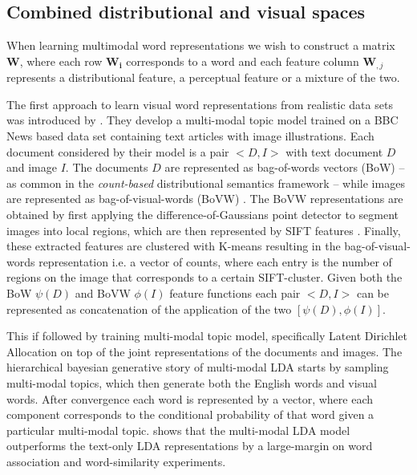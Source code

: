 \subsection{Combined distributional and visual spaces}
\label{sec:distvis}

When learning multimodal word representations we wish to construct a matrix $\mathbf{W}$,
where each row $\mathbf{W_i}$
corresponds to a word and each feature column $\mathbf{W}_{,j}$
represents a distributional feature, a perceptual feature or a mixture of the two.

The first approach to learn visual word representations from realistic data sets
was introduced by \cite{feng2010visual}. They develop a multi-modal topic model trained on a
BBC News based data set containing text articles with image illustrations.
Each document considered by their model
is a pair $<D, I>$ with text document $D$ and image $I$.
The documents $D$ are represented as bag-of-words vectors (BoW) -- as common in the
\emph{count-based} distributional semantics framework -- while images are represented
as bag-of-visual-words (BoVW)  \citep{csurka2004visual}.  The BoVW representations are
obtained by first applying the difference-of-Gaussians point detector to segment images
into local regions, which are then represented by SIFT features \citep{lowe1999object}.
Finally, these extracted features are clustered with K-means resulting in the
bag-of-visual-words  representation i.e.
a vector of counts, where each entry is the number of regions on the image that
corresponds to a certain SIFT-cluster.  Given both the BoW  $\psi(D)$ and
BoVW $\phi(I)$ feature functions each pair $<D, I>$ can be represented as concatenation
of the application of the two $[\psi(D), \phi(I)]$.

 This if followed by training multi-modal
 topic model, specifically Latent Dirichlet Allocation \citep{blei2003latent}
on top of the joint representations of the documents and images.
The hierarchical bayesian generative story of multi-modal LDA  starts by sampling multi-modal topics,
which then generate both the English words and visual words.
After convergence each word is represented by a vector,
where each component corresponds to the conditional probability of that word given
a particular multi-modal topic. \cite{feng2010visual}
shows that the multi-modal LDA model outperforms the text-only LDA representations by a
large-margin on word association and word-similarity experiments.

